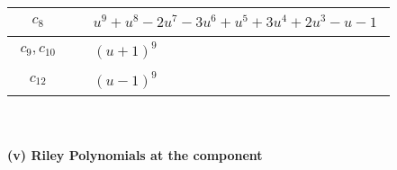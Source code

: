 \documentclass[1p]{elsarticle_modified}
\theoremstyle{definition}
\begin{document}
\begin{tabular}{m{50pt}|m{274pt}}
\hline $$\begin{aligned}c_{8}\end{aligned}$$&$\begin{aligned}
&u^9+u^8-2 u^7-3 u^6+u^5+3 u^4+2 u^3- u-1
\end{aligned}$\\
\hline $$\begin{aligned}c_{9},c_{10}\end{aligned}$$&$\begin{aligned}
&(u+1)^9
\end{aligned}$\\
\hline $$\begin{aligned}c_{12}\end{aligned}$$&$\begin{aligned}
&(u-1)^9
\end{aligned}$\\
\hline
\end{tabular}\\~\\
\newpage\renewcommand{\arraystretch}{1}
\flushleft \textbf{(v) Riley Polynomials at the component}\newline \\
\end{document}
